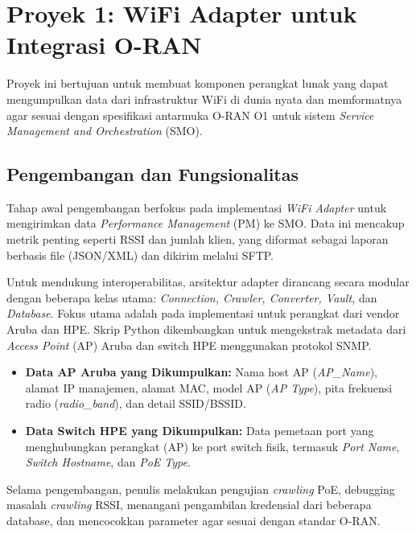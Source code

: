 \section{Proyek 1: WiFi Adapter untuk Integrasi O-RAN}
Proyek ini bertujuan untuk membuat komponen perangkat lunak yang dapat mengumpulkan data dari infrastruktur WiFi di dunia nyata dan memformatnya agar sesuai dengan spesifikasi antarmuka O-RAN O1 untuk sistem \textit{Service Management and Orchestration} (SMO).

\subsection{Pengembangan dan Fungsionalitas}
Tahap awal pengembangan berfokus pada implementasi \textit{WiFi Adapter} untuk mengirimkan data \textit{Performance Management} (PM) ke SMO. Data ini mencakup metrik penting seperti RSSI dan jumlah klien, yang diformat sebagai laporan berbasis file (JSON/XML) dan dikirim melalui SFTP.

Untuk mendukung interoperabilitas, arsitektur adapter dirancang secara modular dengan beberapa kelas utama: \textit{Connection, Crawler, Converter, Vault,} dan \textit{Database}. Fokus utama adalah pada implementasi untuk perangkat dari vendor Aruba dan HPE. Skrip Python dikembangkan untuk mengekstrak metadata dari \textit{Access Point} (AP) Aruba dan switch HPE menggunakan protokol SNMP.
\begin{itemize}
    \item \textbf{Data AP Aruba yang Dikumpulkan:} Nama host AP (\textit{AP\_Name}), alamat IP manajemen, alamat MAC, model AP (\textit{AP Type}), pita frekuensi radio (\textit{radio\_band}), dan detail SSID/BSSID.
    \item \textbf{Data Switch HPE yang Dikumpulkan:} Data pemetaan port yang menghubungkan perangkat (AP) ke port switch fisik, termasuk \textit{Port Name}, \textit{Switch Hostname}, dan \textit{PoE Type}.
\end{itemize}
Selama pengembangan, penulis melakukan pengujian \textit{crawling} PoE, debugging masalah \textit{crawling} RSSI, menangani pengambilan kredensial dari beberapa database, dan mencocokkan parameter agar sesuai dengan standar O-RAN.


